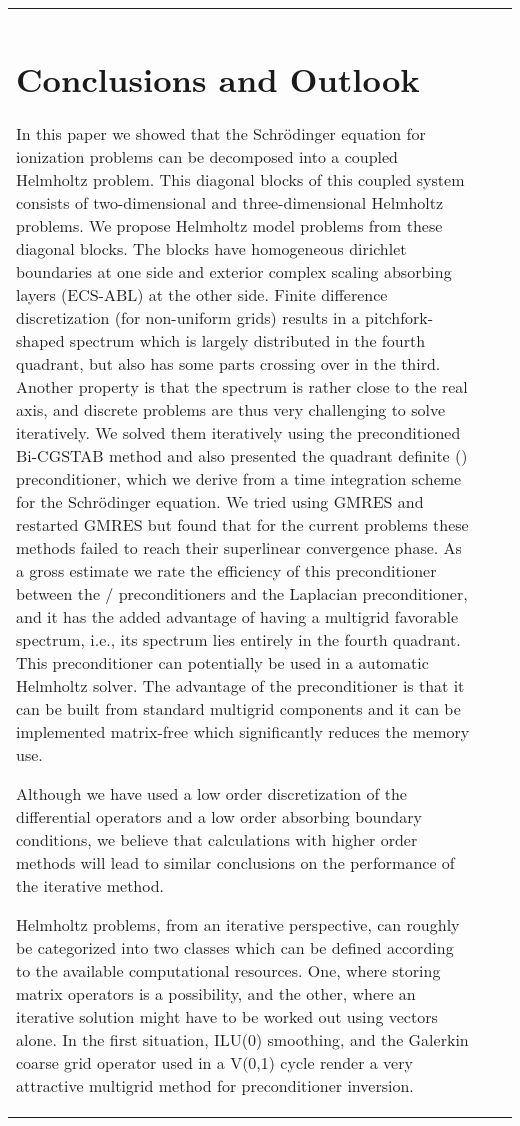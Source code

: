 \documentclass[mathpazo]{cicp}
\theoremstyle{definition}
\numberwithin{equation}{section}
\providecommand{\wv}{}
\providecommand{\edt}{}
\begin{document}
\begin{algorithm}
\begin{enumerate}
\begin{tabular}{lll}
\section{Conclusions and Outlook}
\label{sec:conclude}
In this paper we showed that the Schr\"odinger equation for ionization problems can be decomposed into a coupled Helmholtz problem. This diagonal blocks of this coupled system consists of two-dimensional and three-dimensional Helmholtz problems. We propose Helmholtz model problems from these diagonal blocks. The blocks have homogeneous dirichlet boundaries at one side and exterior complex scaling absorbing layers  (ECS-ABL) at the other side. Finite difference discretization (for non-uniform grids) results in a pitchfork-shaped spectrum which is largely distributed in the fourth quadrant, but also has some parts crossing over in the third. Another property is that the spectrum is rather close to the real axis, and discrete problems are thus very challenging to solve iteratively. We solved them iteratively using the preconditioned Bi-CGSTAB method and also presented the quadrant definite () preconditioner, which we derive from a time integration scheme for the Schr\"odinger equation. \edt{We tried using GMRES and restarted GMRES but found that for the current problems these methods failed to reach their superlinear convergence phase.} As a gross estimate we rate the efficiency of this preconditioner between the /  preconditioners and the Laplacian preconditioner, and it has the added advantage of having a multigrid favorable spectrum, i.e., its spectrum lies entirely in the fourth quadrant. This preconditioner can potentially be used in a automatic Helmholtz solver.  \wv{The advantage of the  preconditioner is that \edt{it} can be \edt{built} from standard multigrid components and it can be \edt{implemented} matrix-free which significantly reduces the memory use}.

\wv{Although we have used a low order discretization  of the differential operators and a low order absorbing boundary conditions, we believe that calculations with higher order methods will lead to \edt{similar} conclusions on the performance of the iterative method.}

Helmholtz problems, from an iterative perspective, can roughly be categorized into two classes which can be defined according to the available computational resources. One, where storing matrix operators is a possibility, and the other, where an iterative solution might have to be worked out using vectors alone. In the first situation, ILU(0) smoothing, and the Galerkin coarse grid operator used in a V(0,1) cycle render a very attractive multigrid method for preconditioner inversion. 


\end{tabular}
\end{enumerate}
\end{algorithm}
\end{document}
